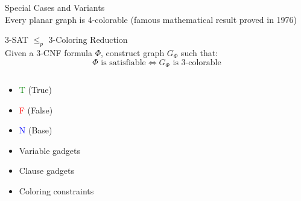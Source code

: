 \documentclass{beamer}
\begin{document}
\begin{frame}{Special Cases and Variants}
    \textbf{\color{myred}{Four Color Theorem:}} \\
        Every planar graph is 4-colorable (famous mathematical result proved in 1976)

\end{frame}

\begin{frame}{3-SAT $\leq_p$ 3-Coloring Reduction}
    \textbf{\color{myred}{Objective}} \\
        Given a 3-CNF formula $\Phi$, construct graph $G_\Phi$ such that:
        \[
        \Phi \text{ is satisfiable} \iff G_\Phi \text{ is 3-colorable}
        \]

    \begin{columns}[T]
        \begin{column}{0.5\textwidth}
            \textbf{\color{myred}{Color Semantics:}}
                \begin{itemize}
                    \item \textcolor{green}{T} (True)
                    \item \textcolor{red}{F} (False)
                    \item \textcolor{blue}{N} (Base)
                \end{itemize}

            \textbf{\color{myred}{Key Components:}}
                \begin{itemize}
                    \item Variable gadgets
                    \item Clause gadgets
                    \item Coloring constraints
                \end{itemize}
        \end{column}

        \begin{column}{0.5\textwidth}
            \begin{center}
            \end{center}
        \end{column}
    \end{columns}
\end{frame}
\end{document}
